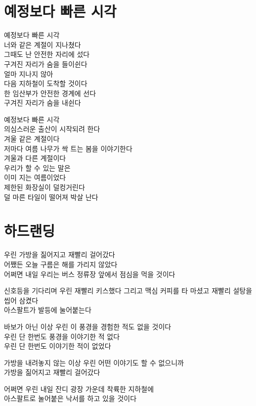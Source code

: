 \begin{article}
\hypertarget{uxc608uxc815uxbcf4uxb2e4-uxbe60uxb978-uxc2dcuxac01}{%
\chapter{예정보다 빠른 시각}\label{uxc608uxc815uxbcf4uxb2e4-uxbe60uxb978-uxc2dcuxac01}}

예정보다 빠른 시각\\
너와 같은 계절이 지나쳤다\\
그때도 난 안전한 자리에 섰다\\
구겨진 자리가 숨을 들이쉰다\\
얼마 지나지 않아\\
다음 지하철이 도착할 것이다\\
한 임산부가 안전한 경계에 선다\\
구겨진 자리가 숨을 내쉰다

예정보다 빠른 시각\\
의심스러운 출산이 시작되려 한다\\
겨울 같은 계절이다\\
저마다 여름 나무가 싹 트는 봄을 이야기한다\\
겨울과 다른 계절이다\\
우리가 할 수 있는 말은\\
이미 지는 여름이었다\\
제한된 화장실이 덜컹거린다\\
덜 마른 타일이 떨어져 박살 난다
\end{article}

\begin{article}
\hypertarget{uxd558uxb4dcuxb79cuxb529}{%
\chapter{하드랜딩}\label{uxd558uxb4dcuxb79cuxb529}}

우린 가방을 짊어지고 재빨리 걸어갔다\\
어쨌든 오늘 구름은 해를 가리지 않았다\\
어쩌면 내일 우리는 버스 정류장 앞에서 점심을 먹을 것이다

신호등을 기다리며 우린 재빨리 키스했다 그리고 맥심 커피를 타 마셨고 재빨리 설탕을 씹어 삼켰다\\
아스팔트가 발등에 눌어붙는다

바보가 아닌 이상 우린 이 풍경을 경험한 적도 없을 것이다\\
우린 단 한번도 풍경을 이야기한 적 없다\\
우린 단 한번도 이야기한 적이 없었다

가방을 내려놓지 않는 이상 우린 어떤 이야기도 할 수 없으니까\\
가방을 짊어지고 재빨리 걸어갔다

어쩌면 우린 내일 잔디 광장 가운데 착륙한 지하철에\\
아스팔트로 눌어붙은 낙서를 하고 있을 것이다
\end{article}

